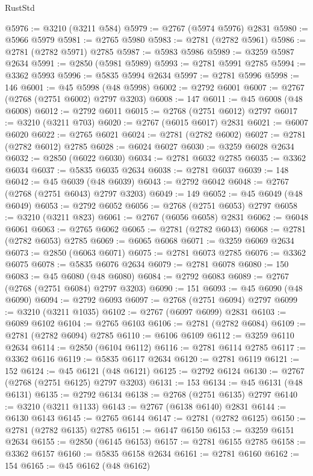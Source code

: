 \begin{lexlean}{RustStd}
\begin{coremodule}
@5976 := @3210 (@3211 @584)
@5979 := @2767 (@5974 @5976) @2831
@5980 := @5966 @5979
@5981 := @2765 @5980
@5983 := @2781 (@2782 @5961)
@5986 := @2781 (@2782 @5971) @2785
@5987 := @5983 @5986
@5989 := @3259 @5987 @2634
@5991 := @2850 (@5981 @5989)
@5993 := @2781 @5991 @2785
@5994 := @3362 @5993
@5996 := @5835 @5994 @2634
@5997 := @2781 @5996
@5998 := 146
@6001 := @45 @5998 (@48 @5998)
@6002 := @2792 @6001
@6007 := @2767 (@2768 (@2751 @6002) @2797 @3203)
@6008 := 147
@6011 := @45 @6008 (@48 @6008)
@6012 := @2792 @6011
@6015 := @2768 (@2751 @6012) @2797
@6017 := @3210 (@3211 @703)
@6020 := @2767 (@6015 @6017) @2831
@6021 := @6007 @6020
@6022 := @2765 @6021
@6024 := @2781 (@2782 @6002)
@6027 := @2781 (@2782 @6012) @2785
@6028 := @6024 @6027
@6030 := @3259 @6028 @2634
@6032 := @2850 (@6022 @6030)
@6034 := @2781 @6032 @2785
@6035 := @3362 @6034
@6037 := @5835 @6035 @2634
@6038 := @2781 @6037
@6039 := 148
@6042 := @45 @6039 (@48 @6039)
@6043 := @2792 @6042
@6048 := @2767 (@2768 (@2751 @6043) @2797 @3203)
@6049 := 149
@6052 := @45 @6049 (@48 @6049)
@6053 := @2792 @6052
@6056 := @2768 (@2751 @6053) @2797
@6058 := @3210 (@3211 @823)
@6061 := @2767 (@6056 @6058) @2831
@6062 := @6048 @6061
@6063 := @2765 @6062
@6065 := @2781 (@2782 @6043)
@6068 := @2781 (@2782 @6053) @2785
@6069 := @6065 @6068
@6071 := @3259 @6069 @2634
@6073 := @2850 (@6063 @6071)
@6075 := @2781 @6073 @2785
@6076 := @3362 @6075
@6078 := @5835 @6076 @2634
@6079 := @2781 @6078
@6080 := 150
@6083 := @45 @6080 (@48 @6080)
@6084 := @2792 @6083
@6089 := @2767 (@2768 (@2751 @6084) @2797 @3203)
@6090 := 151
@6093 := @45 @6090 (@48 @6090)
@6094 := @2792 @6093
@6097 := @2768 (@2751 @6094) @2797
@6099 := @3210 (@3211 @1035)
@6102 := @2767 (@6097 @6099) @2831
@6103 := @6089 @6102
@6104 := @2765 @6103
@6106 := @2781 (@2782 @6084)
@6109 := @2781 (@2782 @6094) @2785
@6110 := @6106 @6109
@6112 := @3259 @6110 @2634
@6114 := @2850 (@6104 @6112)
@6116 := @2781 @6114 @2785
@6117 := @3362 @6116
@6119 := @5835 @6117 @2634
@6120 := @2781 @6119
@6121 := 152
@6124 := @45 @6121 (@48 @6121)
@6125 := @2792 @6124
@6130 := @2767 (@2768 (@2751 @6125) @2797 @3203)
@6131 := 153
@6134 := @45 @6131 (@48 @6131)
@6135 := @2792 @6134
@6138 := @2768 (@2751 @6135) @2797
@6140 := @3210 (@3211 @1133)
@6143 := @2767 (@6138 @6140) @2831
@6144 := @6130 @6143
@6145 := @2765 @6144
@6147 := @2781 (@2782 @6125)
@6150 := @2781 (@2782 @6135) @2785
@6151 := @6147 @6150
@6153 := @3259 @6151 @2634
@6155 := @2850 (@6145 @6153)
@6157 := @2781 @6155 @2785
@6158 := @3362 @6157
@6160 := @5835 @6158 @2634
@6161 := @2781 @6160
@6162 := 154
@6165 := @45 @6162 (@48 @6162)

\end{coremodule}
\end{lexlean}
